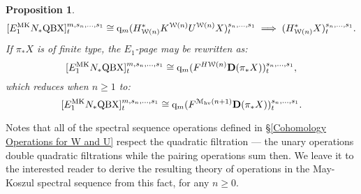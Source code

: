\documentclass[11pt]{amsart} \renewcommand{\baselinestretch}{1.2}
\theoremstyle{plain}
\newtheorem{prop}[thm]{Proposition}
\numberwithin{equation}{section} %
\theoremstyle{plain}
\newtheorem{prop}[thm]{Proposition}
\numberwithin{equation}{chapter} %
\newcommand{\calw}{\mathcal{W}}
\newcommand{\calMhv}{\mathcal{M}_\mathrm{hv}}
\newcommand{\HA}[1]{H#1}
\newcommand{\quadgrad}[1]{\mathrm{q}_{#1}}
\newcommand{\E}[5]{[E^{#1}_{#2}#3]^{#4}_{#5}}
\newcommand{\dual}{\mathbf{D}}
\begin{document}
\begin{May sseq and vanishing line}
\begin{prop}
\[\E{\textup{MK}}{1}{N_*\textup{QBX}}{m,s_n,\ldots,s_1}{t}\cong \quadgrad{m}(H^*_{\calw(n)}K^{\calw(n)}U^{\calw(n)}X)^{s_n,\ldots,s_1}_{t}\implies (H^*_{\calw(n)}X)^{s_n,\ldots,s_1}_{t}.\]
If $\pi_*X$ is of finite type, the $E_1$-page may be rewritten as:
\[\E{\textup{MK}}{1}{N_*\textup{QBX}}{m,s_n,\ldots,s_1}{t}\cong \quadgrad{m}(F^{\HA{\calw(n)}}\dual(\pi_*X))^{s_n,\ldots,s_1}_{t},\]
which reduces when $n\geq1$ to:
\[\E{\textup{MK}}{1}{N_*\textup{QBX}}{m,s_n,\ldots,s_1}{t}\cong \quadgrad{m}(F^{\calMhv(n+1)}\dual(\pi_*X))^{s_n,\ldots,s_1}_{t}.\]
\end{prop}
\noindent Notes that all of the spectral sequence operations defined in \S\ref{Cohomology Operations for W and U} respect the quadratic filtration --- the unary operations double quadratic filtrations while the pairing operations sum then. We leave it to the interested reader to derive the resulting theory of operations in the May-Koszul spectral sequence from this fact, for any $n\geq0$.


\end{May sseq and vanishing line}
\end{document}
